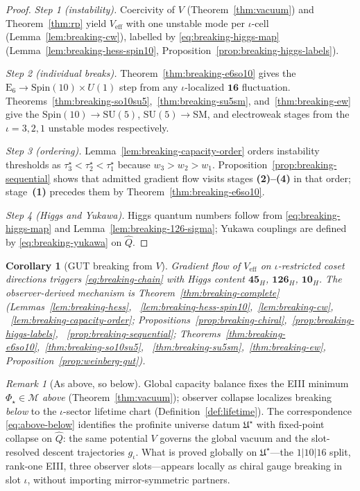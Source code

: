 \documentclass[11pt]{article}
\theoremstyle{plain}
\newtheorem{corollary}[theorem]{Corollary}
\theoremstyle{definition}
\theoremstyle{remark}
\newtheorem{remark}[theorem]{Remark}
\numberwithin{equation}{section}
\newcommand{\E}[1]{\mathrm{E}_{#1}}
\newcommand{\Spin}{\mathrm{Spin}}
\newcommand{\orderparam}{\Phi}
\begin{document}
\begin{proof}
\emph{Step 1 (instability).} Coercivity of $V$ (Theorem~\ref{thm:vacuum})
and Theorem~\ref{thm:rp} yield $V_{\mathrm{eff}}$ with one unstable mode per
$\iota$-cell (Lemma~\ref{lem:breaking-cw}), labelled by
\eqref{eq:breaking-higgs-map} (Lemma~\ref{lem:breaking-hess-spin10},
Proposition~\ref{prop:breaking-higgs-labels}).

\emph{Step 2 (individual breaks).} Theorem~\ref{thm:breaking-e6so10} gives
the $\E{6}\to\Spin(10)\times U(1)$ step from any $\iota$-localized $\mathbf{16}$
fluctuation. Theorems~\ref{thm:breaking-so10su5},~\ref{thm:breaking-su5sm},
and~\ref{thm:breaking-ew} give the $\Spin(10)\to\mathrm{SU}(5)$,
$\mathrm{SU}(5)\to$SM, and electroweak stages from the $\iota=3,2,1$ unstable
modes respectively.

\emph{Step 3 (ordering).} Lemma~\ref{lem:breaking-capacity-order} orders
instability thresholds as $\tau_3^\star<\tau_2^\star<\tau_1^\star$ because
$w_3>w_2>w_1$. Proposition~\ref{prop:breaking-sequential} shows that admitted
gradient flow visits stages \textbf{(2)--(4)} in that order; stage~\textbf{(1)}
precedes them by Theorem~\ref{thm:breaking-e6so10}.

\emph{Step 4 (Higgs and Yukawa).} Higgs quantum numbers follow from
\eqref{eq:breaking-higgs-map} and Lemma~\ref{lem:breaking-126-sigma}; Yukawa
couplings are defined by \eqref{eq:breaking-yukawa} on $\hat Q$.
\end{proof}

\begin{corollary}[GUT breaking from $V$]\label{cor:breaking}
Gradient flow of $V_{\mathrm{eff}}$ on $\iota$-restricted coset directions
triggers \eqref{eq:breaking-chain} with Higgs content $\mathbf{45}_H$,
$\mathbf{126}_H$, $\mathbf{10}_H$. The observer-derived mechanism is
Theorem~\ref{thm:breaking-complete} (Lemmas~\ref{lem:breaking-hess},
~\ref{lem:breaking-hess-spin10},~\ref{lem:breaking-cw},
~\ref{lem:breaking-capacity-order};
Propositions~\ref{prop:breaking-chiral},~\ref{prop:breaking-higgs-labels},
~\ref{prop:breaking-sequential};
Theorems~\ref{thm:breaking-e6so10},~\ref{thm:breaking-so10su5},
~\ref{thm:breaking-su5sm},~\ref{thm:breaking-ew},
Proposition~\ref{prop:weinberg-gut}).
\end{corollary}

\begin{remark}[As above, so below]\label{rem:breaking-above-below}
Global capacity balance fixes the EIII minimum $\orderparam_\star\in\mathcal{M}$
\emph{above} (Theorem~\ref{thm:vacuum}); observer collapse localizes breaking
\emph{below} to the $\iota$-sector lifetime chart
(Definition~\ref{def:lifetime}). The correspondence \eqref{eq:above-below}
identifies the profinite universe datum $\mathfrak{U}^\star$ with fixed-point
collapse on $\hat Q$: the same potential $V$ governs the global vacuum and the
slot-resolved descent trajectories $g_\iota$. What is proved globally on
$\mathfrak{U}^\star$---the $1|10|16$ split, rank-one EIII, three observer
slots---appears locally as chiral gauge breaking in slot $\iota$, without
importing mirror-symmetric partners.
\end{remark}
\end{document}
